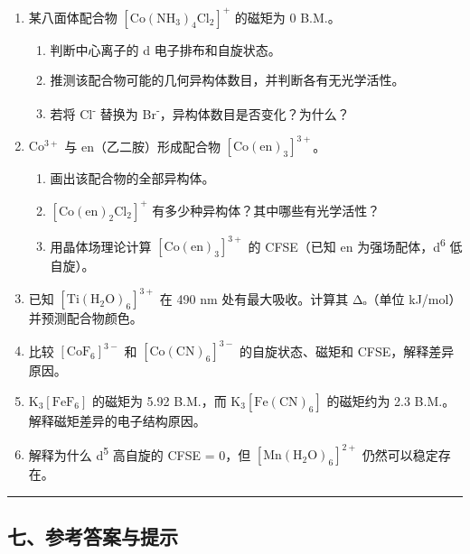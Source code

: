 \documentclass[a4paper,11pt]{ctexart}
\providecommand{\tightlist}{\setlength{\itemsep}{0pt}\setlength{\parskip}{0pt}}
\begin{document}
\begin{enumerate}
\def\labelenumi{\arabic{enumi}.}
\setcounter{enumi}{9}
\item
  某八面体配合物 \(\mathrm{[Co(NH_3)_4Cl_2]^+}\) 的磁矩为 0 B.M.。

  \begin{enumerate}
  \def\labelenumii{(\arabic{enumii})}
  \tightlist
  \item
    判断中心离子的 d 电子排布和自旋状态。
  \item
    推测该配合物可能的几何异构体数目，并判断各有无光学活性。
  \item
    若将 Cl\textsuperscript{-} 替换为 Br\textsuperscript{-}，异构体数目是否变化？为什么？
  \end{enumerate}
\item
  \(\mathrm{Co^{3+}}\) 与 en（乙二胺）形成配合物 \(\mathrm{[Co(en)_3]^{3+}}\)。

  \begin{enumerate}
  \def\labelenumii{(\arabic{enumii})}
  \tightlist
  \item
    画出该配合物的全部异构体。
  \item
    \(\mathrm{[Co(en)_2Cl_2]^+}\) 有多少种异构体？其中哪些有光学活性？
  \item
    用晶体场理论计算 \(\mathrm{[Co(en)_3]^{3+}}\) 的 CFSE（已知 en 为强场配体，d\textsuperscript{6} 低自旋）。
  \end{enumerate}
\item
  已知 \(\mathrm{[Ti(H_2O)_6]^{3+}}\) 在 490 nm 处有最大吸收。计算其 Δₒ（单位 kJ/mol）并预测配合物颜色。
\item
  比较 \([\mathrm{CoF_6}]^{3-}\) 和 \([\mathrm{Co(CN)_6}]^{3-}\) 的自旋状态、磁矩和 CFSE，解释差异原因。
\item
  \(\mathrm{K_3[FeF_6]}\) 的磁矩为 5.92 B.M.，而 \(\mathrm{K_3[Fe(CN)_6]}\) 的磁矩约为 2.3 B.M.。解释磁矩差异的电子结构原因。
\item
  解释为什么 d\textsuperscript{5} 高自旋的 CFSE = 0，但 \([\mathrm{Mn(H_2O)_6}]^{2+}\) 仍然可以稳定存在。
\end{enumerate}

\begin{center}\rule{0.5\linewidth}{0.5pt}\end{center}

\subsection{七、参考答案与提示}\label{ux4e03ux53c2ux8003ux7b54ux6848ux4e0eux63d0ux793a}
\end{document}
